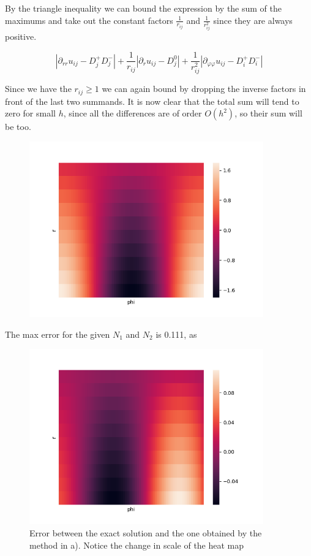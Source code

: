 By the triangle inequality we can bound the expression by the sum of the maximums and take out the constant factors $\frac{1}{r_{ij}}$ and $\frac{1}{r_{ij}^2}$ since they are always positive.

\begin{equation*}
    |\partial_{rr}u_{ij}-D^{+}_jD^{-}_j|
    +\frac{1}{r_{ij}}|\partial_{r}u_{ij}-D^{0}_j|
    +\frac{1}{r_{ij}^2}|\partial_{\varphi\varphi}u_{ij}-D^{+}_iD^{-}_i|
\end{equation*}

Since we have the $r_{ij}\geq 1$ we can again bound by dropping the inverse factors in front of the last two summands. It is now clear that the total sum will tend to zero for small $h$, since all the differences are of order $O(h^2)$, so their sum will be too.

%
\begin{figure}[H]
	\centering
	\includegraphics[width=0.9\textwidth]{Documentation/Figures/a06ex02c_uh.png} 
	\caption{}
	\label{fig:a05ex02b}
\end{figure}

The max error for the given $N_1$ and $N_2$ is 0.111, as 

\begin{figure}[H]
	\centering
	\includegraphics[width=0.9\textwidth]{Documentation/Figures/a06ex02c_error.png} 
	\caption{Error between the exact solution and the one obtained by the method in a). Notice the change in scale of the heat map}
	\label{fig:a05ex02b}
\end{figure}

